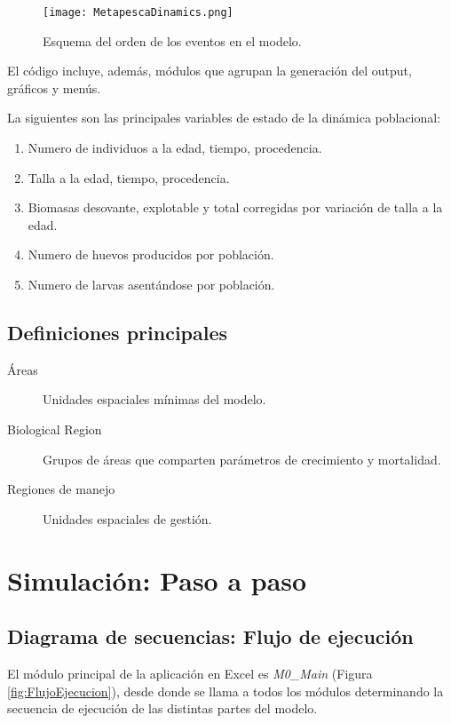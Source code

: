 \documentclass[12pt, oneside, a4paper]{article}
\begin{document}
			\begin{figure}[htb]
				\begin{center}
					\texttt{[image: MetapescaDinamics.png]}
					\caption{Esquema del orden de los eventos en el modelo.}
					\label{fig:Esquema general}
				\end{center}
			\end{figure}	
		
		El código incluye, además, módulos que agrupan la generación del output, gráficos y menús. 

		La siguientes son las principales variables de estado de la dinámica poblacional:
		\begin{enumerate}
			\item Numero de individuos a la edad, tiempo, procedencia.
			\item Talla a la edad, tiempo, procedencia.
			\item Biomasas desovante, explotable y total corregidas por variación de talla a la edad.
			\item Numero de huevos producidos por población.
			\item Numero de larvas asentándose por población.
		\end{enumerate}
 
 
		\subsection{Definiciones principales}
		
		\begin{description}
		\item[Áreas] Unidades espaciales mínimas del modelo.
		\item[Biological Region] Grupos de áreas que comparten parámetros de crecimiento y mortalidad. 
		\item[Regiones de manejo] Unidades espaciales de gestión. 		
		\end{description}
	\section{Simulación: Paso a paso}
	
		\subsection{Diagrama de secuencias: Flujo de ejecución}
		El módulo principal de la aplicación en Excel es \emph{M0\_Main} (Figura \ref{fig:FlujoEjecucion}), desde donde se llama a todos los módulos determinando la secuencia de ejecución de las distintas partes del modelo.
\end{document}
